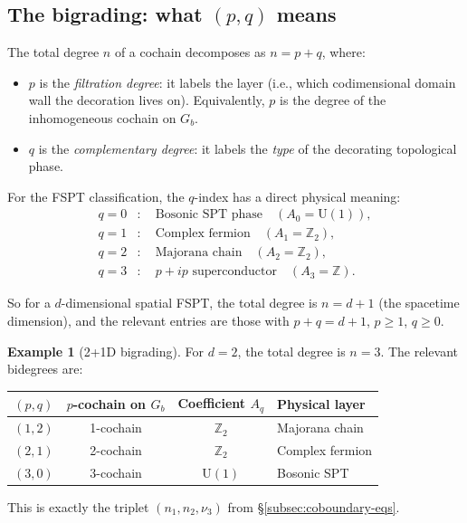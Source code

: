 \documentclass{SciPost}
\theoremstyle{definition}
\newtheorem{example}[theorem]{Example}
\newcommand{\Z}{\mathbb{Z}}
\newcommand{\Zt}{\mathbb{Z}_2}
\newcommand{\U}{\mathrm{U}}
\newcommand{\Gb}{G_b}
\begin{document}
\subsection{The bigrading: what $(p,q)$ means}
\label{subsec:bigrading}

The total degree $n$ of a cochain decomposes as $n = p + q$, where:
\begin{itemize}
    \item $p$ is the \emph{filtration degree}: it labels the layer (i.e., which codimensional domain wall the decoration lives on).
    Equivalently, $p$ is the degree of the inhomogeneous cochain on $\Gb$.
    \item $q$ is the \emph{complementary degree}: it labels the \emph{type} of the decorating topological phase.
\end{itemize}

For the FSPT classification, the $q$-index has a direct physical meaning:
\begin{equation}
\label{eq:q-dictionary}
\boxed{
\begin{aligned}
q = 0 &: \quad \text{Bosonic SPT phase} \quad (A_0 = \U(1)), \\
q = 1 &: \quad \text{Complex fermion} \quad (A_1 = \Zt), \\
q = 2 &: \quad \text{Majorana chain} \quad (A_2 = \Zt), \\
q = 3 &: \quad p+ip \text{ superconductor} \quad (A_3 = \Z).
\end{aligned}
}
\end{equation}

So for a $d$-dimensional spatial FSPT, the total degree is $n = d + 1$ (the spacetime dimension), and the relevant entries are those with $p + q = d + 1$, $p \geq 1$, $q \geq 0$.

\begin{example}[2+1D bigrading]
\label{ex:2d-bigrading}
For $d = 2$, the total degree is $n = 3$.
The relevant bidegrees are:
\begin{center}
\renewcommand{\arraystretch}{1.3}
\begin{tabular}{cccl}
\toprule
$(p,q)$ & $p$-cochain on $\Gb$ & Coefficient $A_q$ & Physical layer \\
\midrule
$(1,2)$ & 1-cochain & $\Zt$ & Majorana chain \\
$(2,1)$ & 2-cochain & $\Zt$ & Complex fermion \\
$(3,0)$ & 3-cochain & $\U(1)$ & Bosonic SPT \\
\bottomrule
\end{tabular}
\end{center}
This is exactly the triplet $(n_1, n_2, \nu_3)$ from \S\ref{subsec:coboundary-eqs}.
\end{example}
\end{document}
